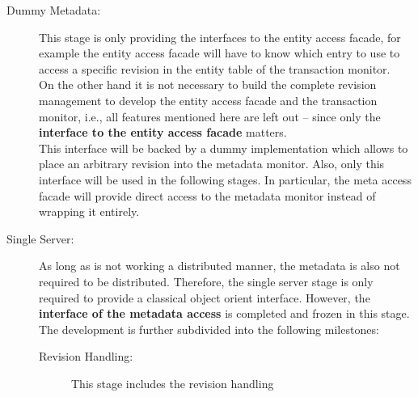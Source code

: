\documentclass[a4paper, 10pt]{book}
\begin{document}
                                \begin{description}
                                    \item[Dummy Metadata:] This stage is only providing the interfaces to
                                        the entity access facade, for example the entity access facade will
                                        have to know which entry to use to access a specific revision in the
                                        entity table of the transaction monitor.\\
                                        On the other hand it is not necessary to build the complete revision
                                        management to develop the entity access facade and the transaction
                                        monitor, i.e., all features mentioned here are left out -- since
                                        only the \textbf{interface to the entity access facade} matters.\\
                                        This interface will be backed by a dummy implementation which allows
                                        to place an arbitrary revision into the metadata monitor. Also, only
                                        this interface will be used in the following stages.
                                        In particular, the meta access facade will provide direct access to
                                        the metadata monitor instead of wrapping it entirely. 
                                    \item[Single Server:] As long as \SYNEIGHT is not working a distributed
                                        manner, the metadata is also not required to be distributed.
                                        Therefore, the single server stage is only required to provide a
                                        classical object orient interface.
                                        However, the \textbf{interface of the metadata access} is completed
                                        and frozen in this stage.
                                        The development is further subdivided into the following milestones:
                                        \begin{description}
                                            \item[Revision Handling:] This stage includes the revision handling

\end{description}
\end{description}
\end{document}
